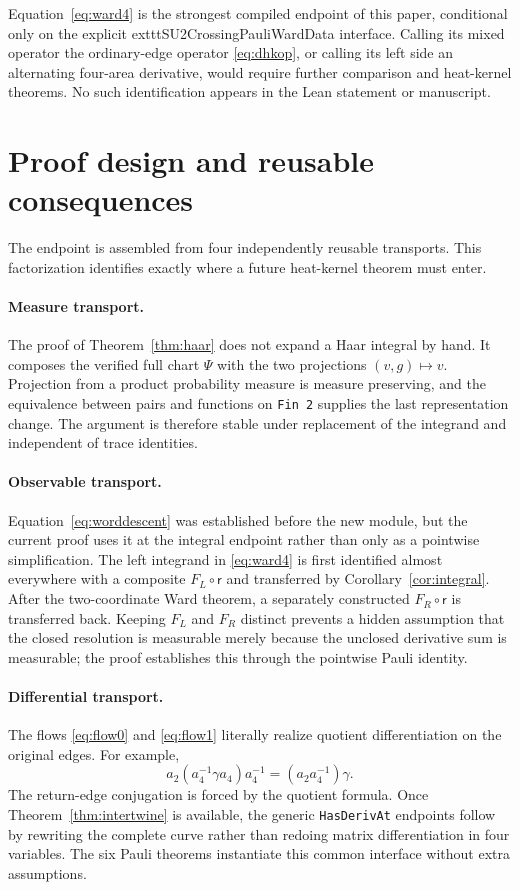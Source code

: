 \documentclass[11pt]{article}
\theoremstyle{definition}
\newcommand{\red}{\mathsf r}
\begin{document}
Equation~\eqref{eq:ward4} is the strongest compiled endpoint of this
paper, conditional only on the explicit 	exttt{SU2CrossingPauliWardData}
interface.  Calling its mixed operator the ordinary-edge operator
\eqref{eq:dhkop}, or calling its left side an alternating four-area
derivative, would require further comparison and heat-kernel theorems.  No
such identification appears in the Lean statement or manuscript.

\section{Proof design and reusable consequences}

The endpoint is assembled from four independently reusable transports.  This
factorization identifies exactly where a future heat-kernel theorem must
enter.

\paragraph{Measure transport.}
The proof of Theorem~\ref{thm:haar} does not expand a Haar integral by hand.
It composes the verified full chart $\Psi$ with the two projections
$(v,g)\mapsto v$.  Projection from a product probability measure is measure
preserving, and the equivalence between pairs and functions on
\texttt{Fin 2} supplies the last representation change.  The argument is
therefore stable under replacement of the integrand and independent of trace
identities.

\paragraph{Observable transport.}
Equation~\eqref{eq:worddescent} was established before the new module, but the
current proof uses it at the integral endpoint rather than only as a
pointwise simplification.  The left integrand in \eqref{eq:ward4} is first
identified almost everywhere with a composite $F_L\circ\red$ and transferred
by Corollary~\ref{cor:integral}.  After the two-coordinate Ward theorem, a
separately constructed $F_R\circ\red$ is transferred back.  Keeping $F_L$
and $F_R$ distinct prevents a hidden assumption that the closed resolution
is measurable merely because the unclosed derivative sum is measurable; the
proof establishes this through the pointwise Pauli identity.

\paragraph{Differential transport.}
The flows \eqref{eq:flow0} and \eqref{eq:flow1} literally realize quotient
differentiation on the original edges.  For example,
\[
 a_2(a_4^{-1}\gamma a_4)a_4^{-1}
   =(a_2a_4^{-1})\gamma.
\]
The return-edge conjugation is forced by the quotient formula.  Once
Theorem~\ref{thm:intertwine} is available, the generic
\texttt{HasDerivAt} endpoints follow by rewriting the complete curve rather
than redoing matrix differentiation in four variables.  The six Pauli
theorems instantiate this common interface without extra assumptions.
\end{document}
